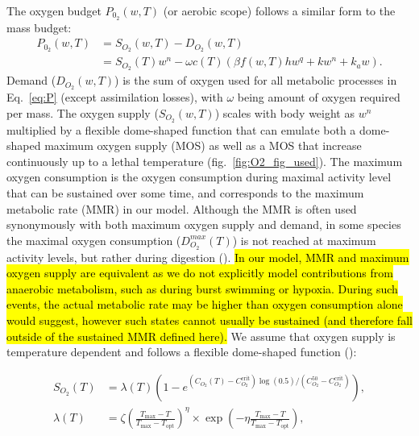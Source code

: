\documentclass[11pt]{article}\usepackage[]{graphicx}\usepackage[]{color,soul}
\begin{document}
The oxygen budget $P_{0_2}(w,T)$ (or aerobic scope) follows a similar form to the mass budget:
\begin{align}
  P_{0_2}(w,T) &= S_{O_2}(w,T) - D_{O_2}(w,T) \\
        &= S_{O_2}(T) w^n - \omega c(T) \left( \beta f(w,T) h w^q + k w^n + k_a w \right).
\end{align}
Demand ($D_{O_2}(w,T)$) is the sum of oxygen used for all metabolic processes in Eq.~\ref{eq:P} (except assimilation losses), with $\omega$ being amount of oxygen required per mass.  The oxygen supply ($S_{O_2}(w,T)$) scales with body weight as $w^n$ multiplied by a flexible dome-shaped function that can emulate both a dome-shaped maximum oxygen supply (MOS) as well as a MOS that increase continuously up to a lethal temperature (fig.~\ref{fig:O2_fig_used}). The maximum oxygen consumption is the oxygen consumption during maximal activity level that can be sustained over some time, and corresponds to the maximum metabolic rate (MMR) in our model. Although the MMR is often used synonymously with both maximum oxygen supply and demand, in some species the maximal oxygen consumption ($D^{max}_{O_2}(T)$) is not reached at maximum activity levels, but rather during digestion (\citealt{priede_metabolic_1985}). \hl{ In our model, MMR and maximum oxygen supply are equivalent as we do not explicitly model contributions from anaerobic metabolism, such as during burst swimming or hypoxia. During such events, the actual metabolic rate may be higher than oxygen consumption alone would suggest, however such states cannot usually be sustained (and therefore fall outside of the sustained MMR defined here).} We assume that oxygen supply is temperature dependent and follows a flexible dome-shaped function (\citealt{gnauck_2013_freshwater, lefrancois_influence_2003}):

\begin{align}
S_{O_2}(T)&=\lambda(T)\left(1-e^{(C_{O_2}(T)-C_{O_2}^{\text{crit}})\log(0.5)/(C_{O_2}^\text{50}-C_{O_2}^{\text{crit}})}\right),\\
\lambda(T)&=\zeta\left(\frac{T_{\text{max}}-T}{T_{\text{max}}-T_{\text{opt}}}\right)^\eta \times \exp\left(-\eta\frac{T_{\text{max}}-T}{T_{\text{max}}-T_{\text{opt}}}\right),
\end{align}
\end{document}
